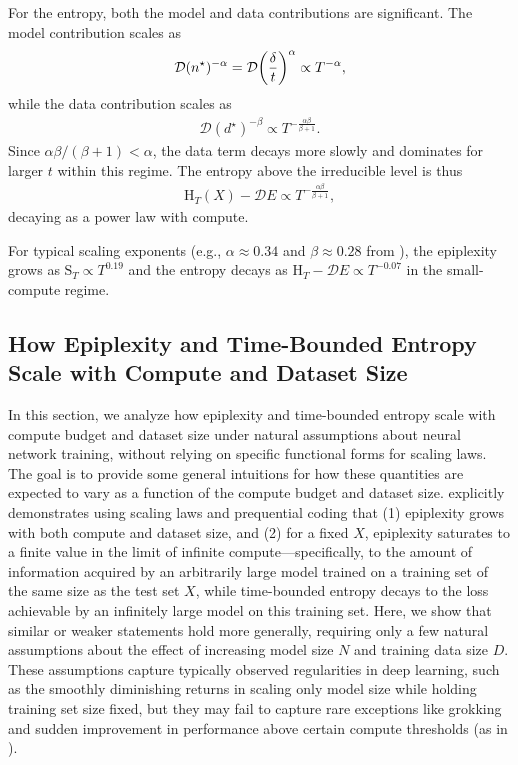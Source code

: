 \documentclass[twoside]{article}
\newcommand{\rH}{\mathrm{H}}
\newcommand{\rS}{\mathrm{S}}
\begin{document}
For the entropy, both the model and data contributions are significant. The model contribution scales as
\begin{align}
    \mathcal{D} (n^\star)^{-\alpha} = \mathcal{D} \qty(\frac{\delta}{t})^{\alpha} \propto T^{-\alpha},
\end{align}
while the data contribution scales as
\begin{align}
    \mathcal{D} (d^\star)^{-\beta} \propto T^{-\frac{\alpha\beta}{\beta+1}}.
\end{align}
Since $\alpha\beta/(\beta+1) < \alpha$, the data term decays more slowly and dominates for larger $t$ within this regime. The entropy above the irreducible level is thus
\begin{align}
    \rH_T(X) - \mathcal{D} E \propto T^{-\frac{\alpha\beta}{\beta+1}},
\end{align}
decaying as a power law with compute.

For typical scaling exponents (e.g., $\alpha \approx 0.34$ and $\beta \approx 0.28$ from \citet{hoffmann2022training}), the epiplexity grows as $\rS_T \propto T^{0.19}$ and the entropy decays as $\rH_T - \mathcal{D} E \propto T^{-0.07}$ in the small-compute regime.


\subsection{How Epiplexity and Time-Bounded Entropy Scale with Compute and Dataset Size} \label{app:epi-scaling}
In this section, we analyze how epiplexity and time-bounded entropy scale with compute budget and dataset size under natural assumptions about neural network training, without relying on specific functional forms for scaling laws. The goal is to provide some general intuitions for how these quantities are expected to vary as a function of the compute budget and dataset size.
 explicitly demonstrates using scaling laws and prequential coding that (1) epiplexity grows with both compute and dataset size, and (2) for a fixed $X$, epiplexity saturates to a finite value in the limit of infinite compute—specifically, to the amount of information acquired by an arbitrarily large model trained on a training set of the same size as the test set $X$, while time-bounded entropy decays to the loss achievable by an infinitely large model on this training set. Here, we show that similar or weaker statements hold more generally, requiring only a few natural assumptions about the effect of increasing model size $N$ and training data size $D$. These assumptions capture typically observed regularities in deep learning, such as the smoothly diminishing returns in scaling only model size while holding training set size fixed, but they may fail to capture rare exceptions like grokking and sudden improvement in performance above certain compute thresholds (as in ).
\end{document}
